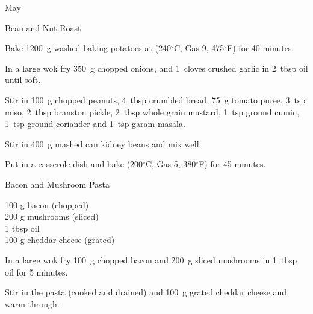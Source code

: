 \begin{menu}{May}
\begin{recipe}{2}{Bean and Nut Roast}
    \begin{instructions}
    \item 
    Bake
    1200~g washed baking potatoes
    at
    (240$^{\circ}$C, Gas 9, 475$^{\circ}$F) for 40 minutes.
  \item 
        In a large wok fry
        350~g chopped onions,
        and
        1~cloves crushed garlic
        in
        2~tbsp  oil
        until soft.
      \item 
        Stir in
        100~g chopped peanuts,
        4~tbsp crumbled bread,
        75~g  tomato puree,
        3~tsp  miso,
        2~tbsp  branston pickle,
        2~tbsp  whole grain mustard,
        1~tsp  ground cumin,
        1~tsp  ground coriander
        and
        1~tsp  garam masala.
      \item 
        Stir in
        400~g mashed can kidney beans
        and mix well.
      \item 
        Put in a casserole dish and
        bake (200$^{\circ}$C, Gas 5, 380$^{\circ}$F) for 45 minutes.
      
    \end{instructions}
    \end{recipe}%
  
    \begin{recipe}{1}{Bacon and Mushroom Pasta}%
		\begin{ingredients}
		100 g bacon (chopped) \\
	200 g mushrooms (sliced) \\
	1 tbsp oil  \\
	100 g cheddar cheese (grated) \\
	
		\end{ingredients}
	
	
    \begin{instructions}
    \item \item 
        In a large wok fry 100~g chopped bacon
        and
        200~g sliced mushrooms
        in
        1~tbsp  oil for 5 minutes.
      \item 
        Stir in the pasta (cooked and drained)
        and 100~g grated cheddar cheese
        and warm through.
      
    \end{instructions}
    \end{recipe}%
  

\end{menu}
